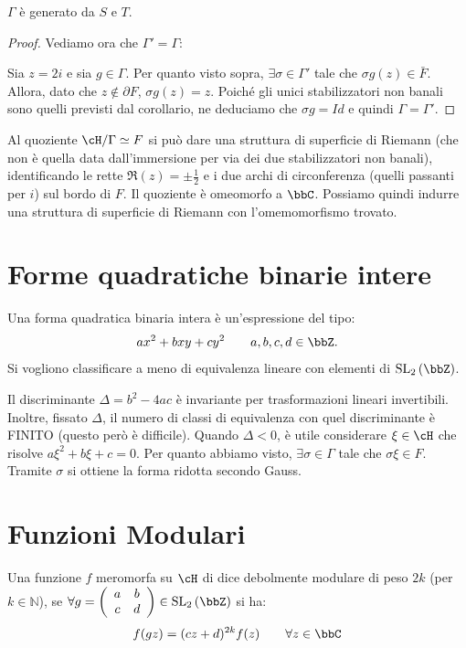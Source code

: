 \begin{teorema}
$\Gamma$ è generato da $S$ e $T$.
\end{teorema}

\begin{proof}
Vediamo ora che $\Gamma'=\Gamma$:

Sia $z=2i$ e sia $g \in \Gamma$. Per quanto visto sopra, $\exists \sigma \in \Gamma'$
tale che $\sigma g(z) \in \bar{F}$. Allora, dato che $z \notin \partial F$,
$\sigma g(z) = z$.
Poiché gli unici stabilizzatori non banali sono quelli
previsti dal corollario, ne deduciamo che $\sigma g = Id$ e quindi $\Gamma = \Gamma'$.
\end{proof}

\begin{osservazione}
  Al quoziente $\cH/\Gamma \simeq F$ si può dare una struttura di superficie di Riemann
  (che non è quella data dall'immersione per via dei due stabilizzatori non banali),
  identificando le rette $\Re(z)=\pm \frac{1}{2}$ e i due archi di circonferenza
  (quelli passanti per $i$) sul bordo di $F$. Il quoziente è omeomorfo a $\bbC$.
  Possiamo quindi indurre una struttura di superficie di Riemann con l'omemomorfismo trovato.
\end{osservazione}

\section{Forme quadratiche binarie intere}
Una forma quadratica binaria intera è un'espressione del tipo:
\[
	ax^2+bxy+cy^2 \qquad a,b,c,d \in \bbZ.
\]
Si vogliono classificare a meno di equivalenza lineare con elementi di
$\SL_2 \left( \bbZ \right)$.

\begin{osservazione}
Il discriminante $\Delta = b^2 - 4 a c$ è invariante per trasformazioni lineari
invertibili. Inoltre, fissato $\Delta$, il numero di classi di equivalenza con
quel discriminante è FINITO (questo però è difficile).
Quando $\Delta < 0$, è utile considerare $\xi \in \cH$ che risolve
$a \xi^2 + b \xi + c =0$. Per quanto abbiamo visto, $\exists \sigma \in \Gamma$
tale che $\sigma \xi \in F$. Tramite $\sigma$ si ottiene la forma ridotta secondo
Gauss.
\end{osservazione}

\section{Funzioni Modulari}
\begin{definizione}
Una funzione $f$ meromorfa su $\cH$ di dice debolmente modulare di peso $2k$ (per $k \in \mathbb{N}$), se $\forall g =
\left( \begin{array}{cc} a & b \\ c & d \end{array} \right) \in
\SL_2 \left( \bbZ \right)$ si ha:
	\[
		f(g z) = (c z + d)^{2 k} f(z)
		\qquad \forall z \in \bbC
	\]
\end{definizione}

